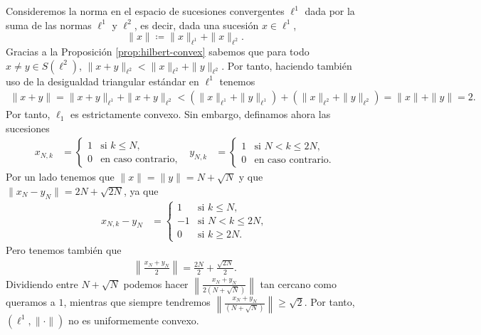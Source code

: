 \begin{example}
    Consideremos la norma en el espacio de sucesiones convergentes $ \ell^1 $ dada por la suma de las normas $ \ell^1 $ y $ \ell^2 $, es decir, dada una sucesión $ x \in \ell^1 $,
    $$
        \| x \| \coloneq \| x \|_{\ell^1} + \| x \|_{\ell^2}.
    $$
    Gracias a la Proposición \ref{prop:hilbert-convex} sabemos que para todo $ x \neq y \in S(\ell^2) $, $ \|x+y\|_{\ell^2} < \|x\|_{\ell^2} + \|y\|_{\ell^2} $. Por tanto, haciendo también uso de la desigualdad triangular estándar en $ \ell^1 $ tenemos
    \begin{align}
        \|x+y\| = \|x+y\|_{\ell^1} + \|x+y\|_{\ell^2} < \left( \|x\|_{\ell^1} + \|y\|_{\ell^1} \right) + \left( \|x\|_{\ell^2} + \|y\|_{\ell^2} \right) = \|x\| + \|y\| = 2.
    \end{align}
    Por tanto, $ \ell_1 $ es estrictamente convexo. Sin embargo, definamos ahora las sucesiones
    \begin{align}
        x_{N, k} &=
        \begin{cases}
            1 & \text{si } k \leq N, \\
            0 & \text{en caso contrario},
        \end{cases}
        &
        y_{N, k} &=
        \begin{cases}
            1 & \text{si } N < k \leq 2N, \\
            0 & \text{en caso contrario}.
        \end{cases}
    \end{align}
    Por un lado tenemos que $ \|x\| = \|y\| = N + \sqrt{N} $ y que $ \|x_N - y_N\| = 2N + \sqrt{2N} $, ya que
    \begin{align}
        x_{N, k} - y_N &=
        \begin{cases}
            1 & \text{si } k \leq N, \\
            -1 & \text{si } N < k \leq 2N, \\
            0 & \text{si } k \geq 2N.
        \end{cases}
    \end{align}
    Pero tenemos también que
    \begin{align}
        \left\| \frac{x_N+y_N}{2} \right\| = \frac{2N}{2} + \frac{\sqrt{2N}}{2}.
    \end{align}
    Dividiendo entre $ N + \sqrt{N} $ podemos hacer $ \left\| \frac{x_N+y_N}{2 (N + \sqrt{N})} \right\| $ tan cercano como queramos a $ 1 $, mientras que siempre tendremos $ \left\| \frac{x_N+y_N}{(N + \sqrt{N})} \right\| \geq \sqrt{2}$. Por tanto, $ (\ell^1, \| \cdot \|) $ no es uniformemente convexo.
\end{example}